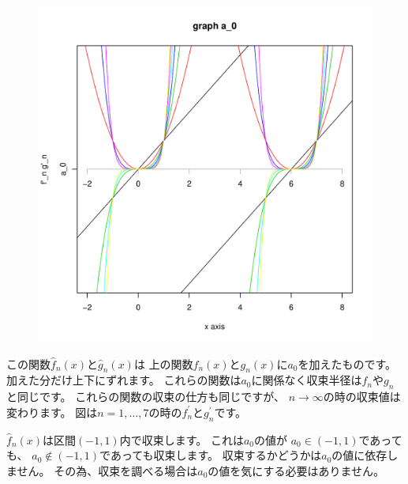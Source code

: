 \documentclass[12pt,b5paper]{ltjsarticle}
\begin{document}
\begin{figure}
 \begin{center}
  \includegraphics[scale=0.4]{graph2_R.pdf}
 \end{center}
\end{figure}
この関数$\hat{f}_n(x)$と$\hat{g}_n(x)$は
上の関数$f_n(x)$と$g_n(x)$に$a_0$を加えたものです。
加えた分だけ上下にずれます。
これらの関数は$a_0$に関係なく収束半径は$f_n$や$g_n$と同じです。
これらの関数の収束の仕方も同じですが、
$n\rightarrow\infty$の時の収束値は変わります。
図は$n=1,\dots,7$の時の$f^\prime_n$と$g^\prime_n$です。


$\hat{f}_n(x)$は区間$(-1,1)$内で収束します。
これは$a_0$の値が
$a_0\in(-1,1)$であっても、
$a_0\not\in(-1,1)$であっても収束します。
収束するかどうかは$a_0$の値に依存しません。
その為、収束を調べる場合は$a_0$の値を気にする必要はありません。
\end{document}
